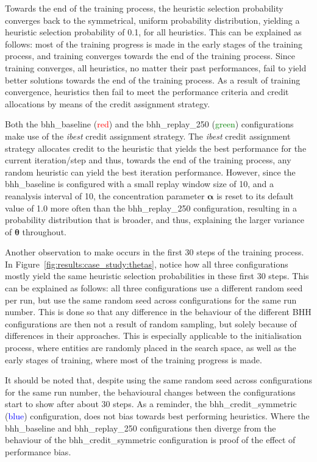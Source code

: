 Towards the end of the training process, the heuristic selection probability converges back to the symmetrical, uniform probability distribution, yielding a heuristic selection probability of 0.1, for all heuristics. This can be explained as follows: most of the training progress is made in the early stages of the training process, and training converges towards the end of the training process. Since training converges, all heuristics, no matter their past performances, fail to yield better solutions towards the end of the training process. As a result of training convergence, heuristics then fail to meet the performance criteria and credit allocations by means of the credit assignment strategy.

Both the bhh\_baseline (\textcolor{red}{red}) and the bhh\_replay\_250 (\textcolor{green}{green}) configurations make use of the \textit{ibest} credit assignment strategy. The \textit{ibest} credit assignment strategy allocates credit to the heuristic that yields the best performance for the current iteration/step and thus, towards the end of the training process, any random heuristic can yield the best iteration performance. However, since the bhh\_baseline is configured with a small replay window size of 10, and a reanalysis interval of 10, the concentration parameter $\boldsymbol{\alpha}$ is reset to its default value of 1.0 more often than the bhh\_replay\_250 configuration, resulting in a probability distribution that is broader, and thus, explaining the larger variance of $\boldsymbol{\theta}$ throughout.

Another observation to make occurs in the first 30 steps of the training process. In Figure~\ref{fig:results:case_study:thetas}, notice how all three configurations mostly yield the same heuristic selection probabilities in these first 30 steps. This can be explained as follows: all three configurations use a different random seed per run, but use the same random seed across configurations for the same run number. This is done so that any difference in the behaviour of the different \acs{BHH} configurations are then not a result of random sampling, but solely because of differences in their approaches. This is especially applicable to the initialisation process, where entities are randomly placed in the search space, as well as the early stages of training, where most of the training progress is made.

It should be noted that, despite using the same random seed across configurations for the same run number, the behavioural changes between the configurations start to show after about 30 steps. As a reminder, the bhh\_credit\_symmetric (\textcolor{blue}{blue}) configuration, does not bias towards best performing heuristics. Where the bhh\_baseline and bhh\_replay\_250 configurations then diverge from the behaviour of the bhh\_credit\_symmetric configuration is proof of the effect of performance bias.

